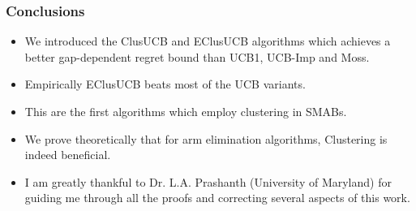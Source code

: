 \begin{frame}
\frametitle{Conclusions}
\begin{itemize}
\item<1-> We introduced the ClusUCB and EClusUCB algorithms which achieves a better gap-dependent regret bound than UCB1, UCB-Imp and Moss.
\item<2-> Empirically EClusUCB beats most of the UCB variants.
\item<3-> This are the first algorithms which employ clustering in SMABs.
\item<4-> We prove theoretically that for arm elimination algorithms, Clustering is indeed beneficial.
\item<5-> I am greatly thankful to Dr. L.A. Prashanth (University of Maryland) for guiding me through all the proofs and correcting several aspects of this work.
\end{itemize}
\end{frame}